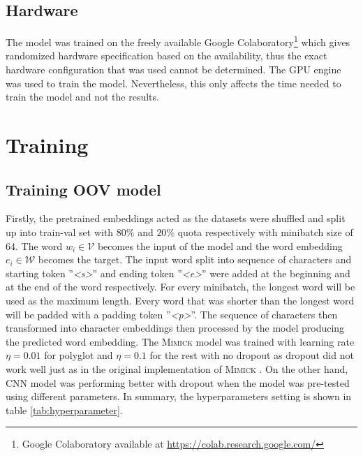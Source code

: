     \subsection{Hardware}
        The model was trained on the freely available Google
        Colaboratory\footnote{Google Colaboratory available at
        \url{https://colab.research.google.com/}} which gives
        randomized hardware specification based on the availability,
        thus the exact hardware configuration that was used cannot be
        determined. The GPU engine was used to train the model.
        Nevertheless, this only affects the time needed to train the
        model and not the results.

\section{Training}
    \subsection{Training OOV model}
        Firstly, the pretrained embeddings acted as the datasets were
        shuffled and split up into train-val set with $80\%$ and
        $20\%$ quota respectively with minibatch size of 64. The word
        $w_i \in \mathcal{V}$ becomes the input of the model and the
        word embedding $e_i \in \mathcal{W}$ becomes the target. The
        input word split into sequence of characters and starting
        token ''\textit{\textless s\textgreater}'' and ending token
        ''\textit{\textless e\textgreater}'' were added at the beginning
        and at the end of the word respectively. For every minibatch,
        the longest word will be used as the maximum length. Every
        word that was shorter than the longest word will be padded
        with a padding token ''\textit{\textless p\textgreater}''.
        The sequence of characters then transformed into character
        embeddings then processed by the model producing the predicted
        word embedding. The \textsc{Mimick} model was trained with
        learning rate $\eta = 0.01$ for polyglot and $\eta = 0.1$ for the
        rest with no dropout as dropout did not work well just as in
        the original implementation of \textsc{Mimick}
        \citep{mimicking2017Pinter}. On the other hand, CNN model was
        performing better with dropout when the model was pre-tested
        using different parameters. In summary, the hyperparameters
        setting is shown in table \ref{tab:hyperparameter}.

